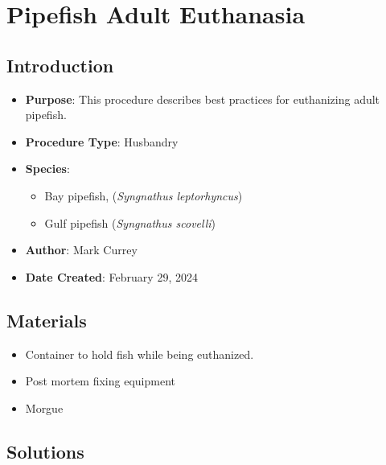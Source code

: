 \documentclass[
  letterpaper,
  DIV=11,
  numbers=noendperiod]{scrreprt}
\providecommand{\tightlist}{%
  \setlength{\itemsep}{0pt}\setlength{\parskip}{0pt}}\usepackage{longtable,booktabs,array}
\begin{document}
\hypertarget{sec-husbandry_adult_syng_euth}{%
\chapter{Pipefish Adult
Euthanasia}\label{sec-husbandry_adult_syng_euth}}

\hypertarget{introduction-37}{%
\section{Introduction}\label{introduction-37}}

\begin{itemize}
\tightlist
\item
  \textbf{Purpose}: This procedure describes best practices for
  euthanizing adult pipefish.
\item
  \textbf{Procedure Type}: Husbandry
\item
  \textbf{Species}:

  \begin{itemize}
  \tightlist
  \item
    Bay pipefish, (\emph{Syngnathus leptorhyncus})
  \item
    Gulf pipefish (\emph{Syngnathus scovelli})
  \end{itemize}
\item
  \textbf{Author}: Mark Currey\\
\item
  \textbf{Date Created}: February 29, 2024
\end{itemize}

\hypertarget{materials-35}{%
\section{Materials}\label{materials-35}}

\begin{itemize}
\tightlist
\item
  Container to hold fish while being euthanized.
\item
  Post mortem fixing equipment
\item
  Morgue
\end{itemize}

\hypertarget{solutions-30}{%
\section{Solutions}\label{solutions-30}}
\end{document}
